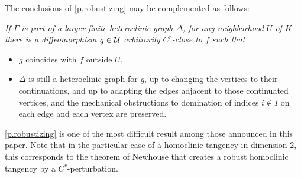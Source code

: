\documentclass[11pt, a4paper]{amsart}
\theoremstyle{plain}
\theoremstyle{definition}
\theoremstyle{remark}
\numberwithin{equation}{section}         %
\begin{document}
The conclusions of \cref{p.robustizing} may be complemented as follows:
\medskip

{\em If $\Gamma$ is part of a larger finite heteroclinic graph $\Delta$, for any neighborhood $U$ of $K$ there is a diffeomorphism $g\in {\mathcal U}$ arbitrarily $C^r$-close to $f$  such that 
\begin{itemize}
\item $g$ coincides with $f$ outside $U$,
\item $\Delta$ is still a heteroclinic graph for $g$, up to changing the vertices to their continuations, and up to adapting the edges adjacent to those continuated vertices, and the mechanical obstructions to domination of indices $i\notin I$ on each edge and each vertex are preserved.
\end{itemize} }


\cref{p.robustizing} is one of the most difficult result among those announced in this paper. Note that in the particular case of a homoclinic tangency in dimension $2$, this corresponds to the theorem of Newhouse that creates a robust homoclinic tangency by a $C^r$-perturbation. 
\end{document}
